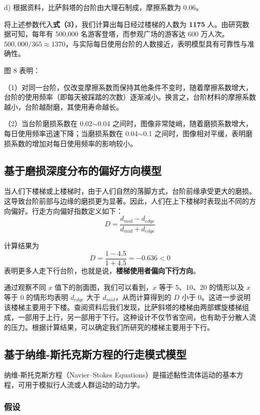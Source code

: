 \documentclass[11pt,a4paper]{ctexart}
\begin{document}
d) 根据资料，比萨斜塔的台阶由大理石制成，摩擦系数为 0.06。

将上述参数代入\textbf{式（3）}，我们计算出每日经过楼梯的人数为 \textbf{1175} 人。由研究数据可知，每年有 500,000 名游客登塔，而参观广场的游客达 600 万人次。$500,000/365\approx 1370$，与实际每日使用台阶的人数接近，表明模型具有可靠性与准确性。

图 8 表明：

（1）对同一台阶，仅改变摩擦系数而保持其他条件不变时，随着摩擦系数增大，台阶的使用频率（即每天被踩踏的次数）逐渐减小。换言之，台阶材料的摩擦系数越小，台阶越耐磨，其使用寿命越长。

（2）当台阶磨损系数在 0.02$\sim$0.04 之间时，图像非常陡峭，随着磨损系数增大，每日使用频率迅速下降；当磨损系数在 0.04$\sim$0.1 之间时，图像相对平缓，表明磨损系数的增加对每日使用频率的影响较小。

\subsection{基于磨损深度分布的偏好方向模型}

当人们下楼梯或上楼梯时，由于人们自然的落脚方式，台阶前缘承受更大的磨损。这导致台阶前部与边缘的磨损更为显著。因此，人们在上下楼梯时表现出不同的方向偏好。行走方向偏好指数定义如下：
\begin{equation}
D=\frac{d_{mid}-d_{edge}}{d_{mid}+d_{edge}}\tag{4}
\end{equation}

计算结果为
\[
D=\frac{1-4.5}{1+4.5}=-0.636<0
\]
表明更多人走下行台阶，也就是说，\textbf{楼梯使用者偏向下行方向}。

通过观察不同 $x$ 值下的剖面图，我们可以看到，$x$ 等于 5、10、20 的情形以及 $x$ 等于 0 的情形均表明 $d_{edge}$ 大于 $d_{mid}$，从而计算得到的 $D$ 小于 0。这进一步说明该楼梯主要用于下楼。查阅资料后我们发现，比萨斜塔的楼梯由两部螺旋楼梯组成，一部用于上行，另一部用于下行。这种设计不仅节省空间，也有助于分散人流的压力。根据计算结果，可以确定我们所研究的楼梯主要用于下行。

\subsection{基于纳维-斯托克斯方程的行走模式模型}

纳维-斯托克斯方程（Navier--Stokes Equations）是描述黏性流体运动的基本方程，可用于模拟行人流或人群运动的动力学。

\subsubsection{假设}
\end{document}
